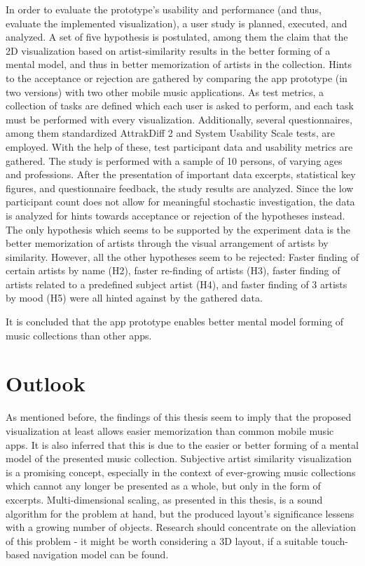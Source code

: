 In order to evaluate the prototype's usability and performance (and thus, evaluate the implemented visualization), a user study is planned, executed, and analyzed. A set of five hypothesis is postulated, among them the claim that the 2D visualization based on artist-similarity results in the better forming of a mental model, and thus in better memorization of artists in the collection. Hints to the acceptance or rejection are gathered by comparing the app prototype (in two versions) with two other mobile music applications. As test metrics, a collection of tasks are defined which each user is asked to perform, and each task must be performed with every visualization. Additionally, several questionnaires, among them standardized AttrakDiff 2 and System Usability Scale tests, are employed. With the help of these, test participant data and usability metrics are gathered. The study is performed with a sample of 10 persons, of varying ages and professions. After the presentation of important data excerpts, statistical key figures, and questionnaire feedback, the study results are analyzed. Since the low participant count does not allow for meaningful stochastic investigation, the data is analyzed for hints towards acceptance or rejection of the hypotheses instead. The only hypothesis which seems to be supported by the experiment data is the better memorization of artists through the visual arrangement of artists by similarity. However, all the other hypotheses seem to be rejected: Faster finding of certain artists by name (H2), faster re-finding of artists (H3), faster finding of artists related to a predefined subject artist (H4), and faster finding of 3 artists by mood (H5) were all hinted against by the gathered data.

 It is concluded that the app prototype enables better mental model forming of music collections than other apps.

\section{Outlook}

As mentioned before, the findings of this thesis seem to imply that the proposed visualization at least allows easier memorization than common mobile music apps. It is also inferred that this is due to the easier or better forming of a mental model of the presented music collection. Subjective artist similarity visualization is a promising concept, especially in the context of ever-growing music collections which cannot any longer be presented as a whole, but only in the form of excerpts. Multi-dimensional scaling, as presented in this thesis, is a sound algorithm for the problem at hand, but the produced layout's significance lessens with a growing number of objects. Research should concentrate on the alleviation of this problem - it might be worth considering a 3D layout, if a suitable touch-based navigation model can be found.

